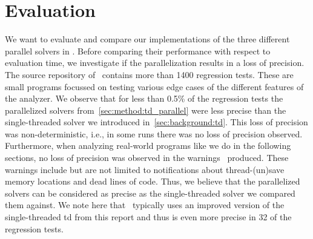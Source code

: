 \section{Evaluation}
\label{sec:eval}
We want to evaluate and compare our implementations of the three different parallel solvers in \gob. Before comparing their performance with respect to evaluation time, we investigate if the parallelization results in a loss of precision.
The source repository of \gob\ contains more than 1400 regression tests. These are small programs focussed on testing various edge cases of the different features of the analyzer. We observe that for less than 0.5\% of the regression tests the parallelized solvers from~\autoref{sec:method:td_parallel} were less precise than the single-threaded solver we introduced in~\autoref{sec:background:td}. This loss of precision was non-deterministic, i.e., in some runs there was no loss of precision observed. Furthermore, when analyzing real-world programs like we do in the following sections, no loss of precision was observed in the warnings \gob\ produced. These warnings include but are not limited to notifications about thread-(un)save memory locations and dead lines of code. Thus, we believe that the parallelized solvers can be considered as precise as the single-threaded solver we compared them against. We note here that \gob\ typically uses an improved version of the single-threaded \ac{td} from this report and thus is even more precise in 32 of the regression tests.

